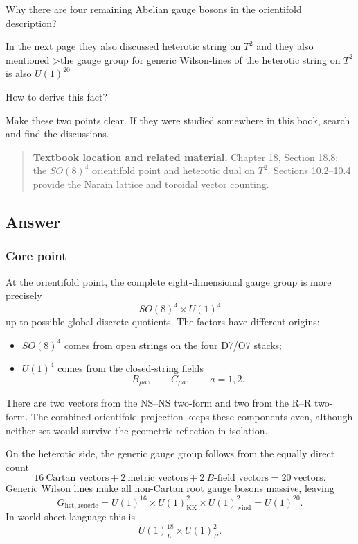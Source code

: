 \documentclass[
  10pt,
  a4paper,
  openany]{book}
\providecommand{\tightlist}{%
  \setlength{\itemsep}{0pt}\setlength{\parskip}{0pt}}
\begin{document}
Why there are four remaining Abelian gauge bosons in the orientifold
description?

In the next page they also discussed heterotic string on \(T^2\) and
they also mentioned \textgreater the gauge group for generic
Wilson-lines of the heterotic string on \(T^2\) is also \(U(1)^{20}\)

How to derive this fact?

Make these two points clear. If they were studied somewhere in this
book, search and find the discussions.

\begin{quote}
\textbf{Textbook location and related material.} Chapter 18, Section
18.8: the \(SO(8)^4\) orientifold point and heterotic dual on \(T^2\).
Sections 10.2--10.4 provide the Narain lattice and toroidal vector
counting.
\end{quote}

\subsection{Answer}\label{answer-43}

\subsubsection{Core point}\label{core-point-43}

At the orientifold point, the complete eight-dimensional gauge group is
more precisely \[
\boxed{
SO(8)^4\times U(1)^4
}
\] up to possible global discrete quotients. The factors have different
origins:

\begin{itemize}
\tightlist
\item
  \(SO(8)^4\) comes from open strings on the four D7/O7 stacks;
\item
  \(U(1)^4\) comes from the closed-string fields \[
  B_{\mu a},
  \qquad
  C_{\mu a},
  \qquad
  a=1,2.
  \]
\end{itemize}

There are two vectors from the NS--NS two-form and two from the R--R
two-form. The combined orientifold projection keeps these components
even, although neither set would survive the geometric reflection in
isolation.

On the heterotic side, the generic gauge group follows from the equally
direct count \[
\boxed{
16\ \text{Cartan vectors}
+2\ \text{metric vectors}
+2\ \text{$B$-field vectors}
=20\ \text{vectors}
}.
\] Generic Wilson lines make all non-Cartan root gauge bosons massive,
leaving \[
\boxed{
G_{\mathrm{het,generic}}
=U(1)^{16}\times U(1)^2_{\mathrm{KK}}
\times U(1)^2_{\mathrm{wind}}
=U(1)^{20}
}.
\] In world-sheet language this is \[
U(1)^{18}_L\times U(1)^2_R.
\]
\end{document}
